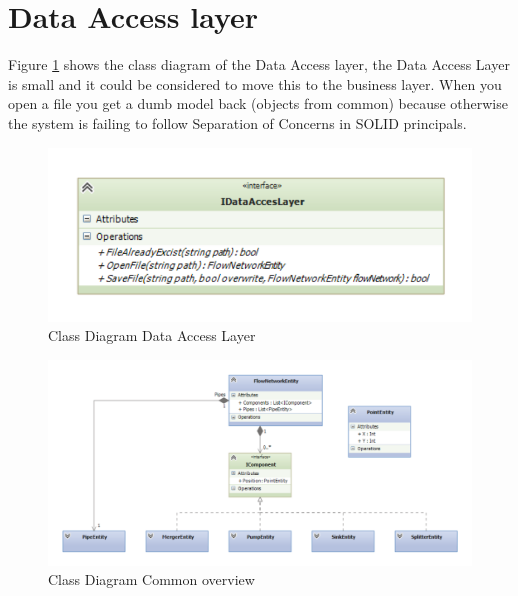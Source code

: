 \section{Data Access layer}
Figure \ref{fig:dataaccess} shows the class diagram of the Data Access layer, the Data Access Layer is small and it could be considered to move this to the business layer. When you open a file you get a dumb model back (objects from common) because otherwise the system is failing to follow Separation of Concerns in SOLID principals.

\begin{figure}[h!]
	\centering
	\includegraphics{figures/ClassDataAccess.pdf}
	\caption{Class Diagram Data Access Layer}
	\label{fig:dataaccess}
\end{figure}

\begin{figure}
	\centering
	\includegraphics[width=\textwidth]{figures/ClassCommonOverall.pdf}
	\caption{Class Diagram Common overview}
	\label{fig:commonoverview}
\end{figure}

